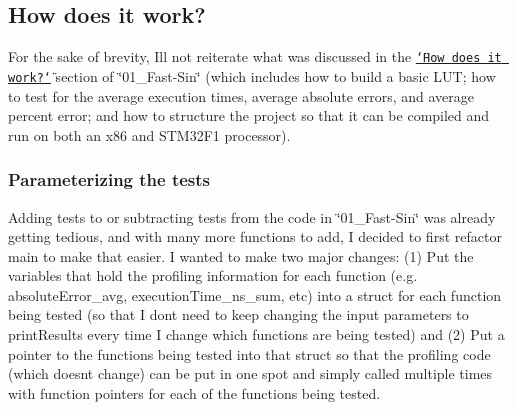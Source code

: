 \subsection*{How does it work?}

For the sake of brevity, I\textquotesingle{}ll not reiterate what was discussed in the \href{https://github.com/nathancharlesjones/Look-up-Table-Examples/blob/master/01_Fast-Sin/README.md#how-does-it-work}{\tt \char`\"{}\+How does it work?\char`\"{}} section of \char`\"{}01\+\_\+\+Fast-\/\+Sin\char`\"{} (which includes how to build a basic L\+UT; how to test for the average execution times, average absolute errors, and average percent error; and how to structure the project so that it can be compiled and run on both an x86 and S\+T\+M32\+F1 processor).

\subsubsection*{Parameterizing the tests}

Adding tests to or subtracting tests from the code in \char`\"{}01\+\_\+\+Fast-\/\+Sin\char`\"{} was already getting tedious, and with many more functions to add, I decided to first refactor {\ttfamily main} to make that easier. I wanted to make two major changes\+: (1) Put the variables that hold the profiling information for each function (e.\+g. {\ttfamily absolute\+Error\+\_\+avg}, {\ttfamily execution\+Time\+\_\+ns\+\_\+sum}, etc) into a struct for each function being tested (so that I don\textquotesingle{}t need to keep changing the input parameters to {\ttfamily print\+Results} every time I change which functions are being tested) and (2) Put a pointer to the functions being tested into that struct so that the profiling code (which doesn\textquotesingle{}t change) can be put in one spot and simply called multiple times with function pointers for each of the functions being tested.

